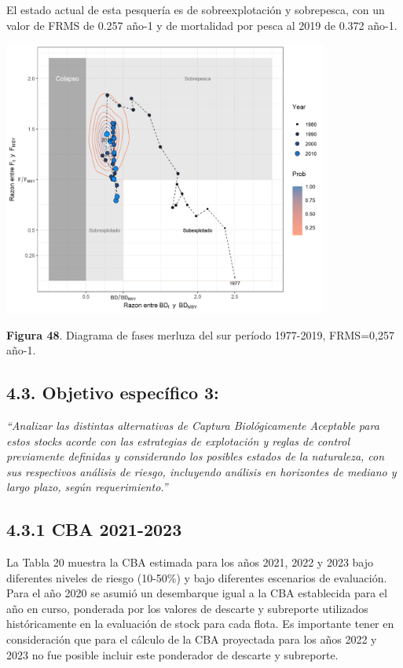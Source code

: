 \documentclass[
  spanish,
]{article}
\begin{document}
El estado actual de esta pesquería es de sobreexplotación y sobrepesca,
con un valor de FRMS de 0.257 año-1 y de mortalidad por pesca al 2019 de
0.372 año-1.

\begin{center}
\includegraphics[width=0.8\textwidth]{Figuras/kobe_plot.png}
\end{center}

\small \textbf{Figura 48}. Diagrama de fases merluza del sur período
1977-2019, FRMS=0,257 año-1. \vspace{0.5cm} \normalsize

\hypertarget{objetivo-especuxedfico-3-1}{%
\subsection{4.3. Objetivo específico
3:}\label{objetivo-especuxedfico-3-1}}

\emph{``Analizar las distintas alternativas de Captura Biológicamente
Aceptable para estos stocks acorde con las estrategias de explotación y
reglas de control previamente definidas y considerando los posibles
estados de la naturaleza, con sus respectivos análisis de riesgo,
incluyendo análisis en horizontes de mediano y largo plazo, según
requerimiento.''}

\hypertarget{cba-2021-2023}{%
\subsection{4.3.1 CBA 2021-2023}\label{cba-2021-2023}}

La Tabla 20 muestra la CBA estimada para los años 2021, 2022 y 2023 bajo
diferentes niveles de riesgo (10-50\%) y bajo diferentes escenarios de
evaluación. Para el año 2020 se asumió un desembarque igual a la CBA
establecida para el año en curso, ponderada por los valores de descarte
y subreporte utilizados históricamente en la evaluación de stock para
cada flota. Es importante tener en consideración que para el cálculo de
la CBA proyectada para los años 2022 y 2023 no fue posible incluir este
ponderador de descarte y subreporte.
\end{document}
